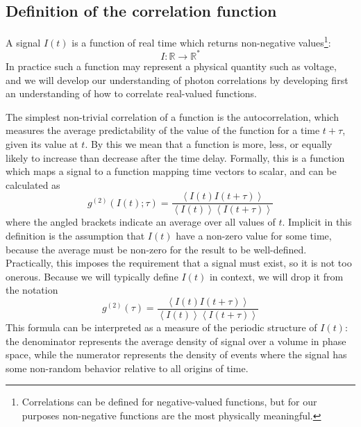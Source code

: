 \documentclass{article}
\newcommand{\angles}[1]{\ensuremath{\left\langle #1 \right\rangle}}
\newcommand{\gn}[1]{\ensuremath{g^{(#1)}}}
\newcommand{\reals}{\ensuremath{\mathbb{R}}}
\begin{document}
\subsection{Definition of the correlation function}
\label{sec:correlation_function}
A signal $I(t)$ is a function of real time which returns non-negative values\footnote{Correlations can be defined for negative-valued functions, but for our purposes non-negative functions are the most physically meaningful.}:
\begin{equation}
I:\reals\rightarrow\reals^{*}
\end{equation}
In practice such a function may represent a physical quantity such as voltage, and we will develop our understanding of photon correlations by developing first an understanding of how to correlate real-valued functions. 

The simplest non-trivial correlation of a function is the autocorrelation, which measures the average predictability of the value of the function for a time $t+\tau$, given its value at $t$. By this we mean that a function is more, less, or equally likely to increase than decrease after the time delay. Formally, this is a function which maps a signal to a function mapping time vectors to scalar, and  can be calculated as
\begin{equation}
\gn{2}(I(t);\tau) = \frac{\angles{I(t)I(t+\tau)}}
                    {\angles{I(t)}\angles{I(t+\tau)}}
\end{equation}
where the angled brackets indicate an average over all values of $t$. Implicit in this definition is the assumption that $I(t)$ have a non-zero value for some time, because the average must be non-zero for the result to be well-defined. Practically, this imposes the requirement that a signal must exist, so it is not too onerous. Because we will typically define $I(t)$ in context, we will drop it from the notation 
\begin{equation}
\label{eq:autocorrelation}
\gn{2}(\tau) = \frac{\angles{I(t)I(t+\tau)}}
                    {\angles{I(t)}\angles{I(t+\tau)}}
\end{equation}
This formula can be interpreted as a measure of the periodic structure of $I(t)$: the denominator represents the average density of signal over a volume in phase space, while the numerator represents the density of events where the signal has some non-random behavior relative to all origins of time. 
\end{document}
